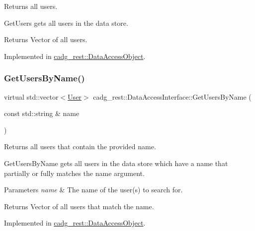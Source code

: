 Returns all users. 

Get\+Users gets all users in the data store. \begin{DoxyReturn}{Returns}
Vector of all users. 
\end{DoxyReturn}


Implemented in \mbox{\hyperlink{classcadg__rest_1_1_data_access_object_a52d1c1333fc65e6a3a6276d044296ca0}{cadg\+\_\+rest\+::\+Data\+Access\+Object}}.

\mbox{\label{classcadg__rest_1_1_data_access_interface_ae6cf7e7fad98f27ffc797a9bf5a6b7df}} 
\subsubsection{\texorpdfstring{GetUsersByName()}{GetUsersByName()}}
{\footnotesize\ttfamily virtual std\+::vector$<$\mbox{\hyperlink{structcadg__rest_1_1_user}{User}}$>$ cadg\+\_\+rest\+::\+Data\+Access\+Interface\+::\+Get\+Users\+By\+Name (\begin{DoxyParamCaption}\item[{const std\+::string \&}]{name }\end{DoxyParamCaption})\hspace{0.3cm}{\ttfamily [pure virtual]}}



Returns all users that contain the provided name. 

Get\+Users\+By\+Name gets all users in the data store which have a name that partially or fully matches the name argument.


\begin{DoxyParams}{Parameters}
{\em name} & The name of the user(s) to search for. \\
\hline
\end{DoxyParams}
\begin{DoxyReturn}{Returns}
Vector of all users that match the name. 
\end{DoxyReturn}


Implemented in \mbox{\hyperlink{classcadg__rest_1_1_data_access_object_af08156c296e0ec18d9885292a549eef8}{cadg\+\_\+rest\+::\+Data\+Access\+Object}}.

\mbox{\label{classcadg__rest_1_1_data_access_interface_a1f3c5c41611ae04a32935df01505c98d}} 
